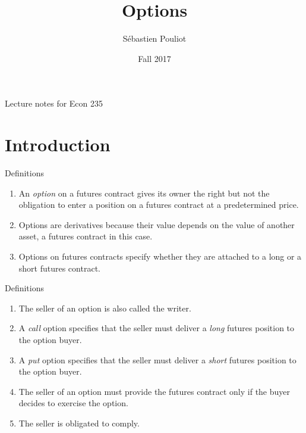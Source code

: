 \documentclass[table,xcolor=pdftex,dvipsnames]{beamer}\usepackage[]{graphicx}\usepackage[]{color}
\title[Options]{Options}
\author[Pouliot]{S\'{e}bastien Pouliot}
\institute{Iowa State University}
\date{Fall 2017}
\begin{document}

\begin{frame}
\titlepage
\vspace{-0.4in}
\begin{center}
Lecture notes for Econ 235\\
\end{center}
\end{frame}

\section{Introduction}

\begin{frame}{Definitions}
\begin{enumerate}[label=\textbullet]
  \item An \emph{option} on a futures contract gives its owner the right but not the obligation to enter a position on a futures contract at a predetermined price.
  \item Options are derivatives because their value depends on the value of another asset, a futures contract in this case.
  \item Options on futures contracts specify whether they are attached to a long or a short futures contract.
\end{enumerate}
\end{frame}


\begin{frame}{Definitions}
\begin{enumerate}[label=\textbullet]
  \item The seller of an option is also called the writer.
  \item A \emph{call} option specifies that the seller must deliver a \emph{long} futures position to the option buyer.
  \item A \emph{put} option specifies that the seller must deliver a \emph{short} futures position to the option buyer.
  \item The seller of an option must provide the futures contract only if the buyer decides to exercise the option.
  \item The seller is obligated to comply.
\end{enumerate}
\end{frame}
\end{document}
